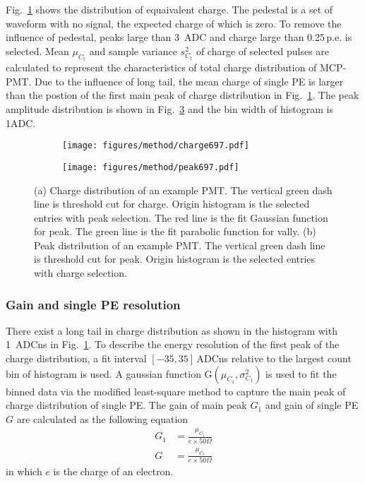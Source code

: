 Fig.~\ref{fig:charge} shows the distribution of equaivalent charge. The pedestal is a set of waveform with no signal, the expected charge of which is zero. To remove the influence of pedestal, peaks large than \SI{3}{ADC} and charge large than 0.25\,p.e. is selected. Mean $\mu_{C_{\mathrm{t}}}$ and sample variance $s^2_{C_{\mathrm{t}}}$ of charge of selected pulses are calculated to represent the characteristics of total charge distribution of MCP-PMT. Due to the influence of long tail, the mean charge of single PE is larger than the postion of the first main peak of charge distribution in Fig.~\ref{fig:charge}. The peak amplitude distribution is shown in Fig.~\ref{fig:peak} and the bin width of histogram is 1ADC.
\begin{figure}[!htbp]
    \centering
    \begin{subfigure}[t]{0.49\textwidth}
        \texttt{[image: figures/method/charge697.pdf]}
        \caption{}%
        \label{fig:charge}
    \end{subfigure}
    \begin{subfigure}[t]{0.49\textwidth}
        \texttt{[image: figures/method/peak697.pdf]}
        \caption{}%
        \label{fig:peak}
    \end{subfigure}
    \caption{(a) Charge distribution of an example PMT. The vertical green dash line is threshold cut for charge. Origin histogram is the selected entries with peak selection. The red line is the fit Gaussian function for peak. The green line is the fit parabolic function for vally. (b) Peak distribution of an example PMT. The vertical green dash line is threshold cut for peak. Origin histogram is the selected entries with charge selection.}
\end{figure}
\subsubsection{Gain and single PE resolution}
\label{sec:noisegain}
There exist a long tail in charge distribution as shown in the histogram with \SI{1}{ADCns} in Fig.~\ref{fig:charge}. To describe the energy resolution of the first peak of the charge distribution, a fit interval $[-35, 35]$\,ADCns relative to the largest count bin of histogram is used. A gaussian function G$(\mu_{C_1},\sigma^2_{C_1})$ is used to fit the binned data via the modified least-square method \cite{Cowan1998StatisticalDA} to capture the main peak of charge distribution of single PE. The gain of main peak $G_1$ and gain of single PE $G$ are calculated as the following equation
\begin{align}
    G_1&=\frac{\mu_{C_1}}{e\times 50\Omega} \\
    G &= \frac{\mu_{C_t}}{e\times 50\Omega}
\end{align}
in which $e$ is the charge of an electron.

